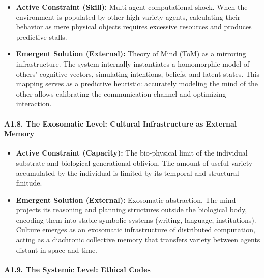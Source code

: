 \documentclass[11pt,a4paper,oneside]{article} %
\providecommand{\tightlist}{%
  \setlength{\itemsep}{0pt}\setlength{\parskip}{0pt}}
\begin{document}
\begin{itemize}
\tightlist
\item
  \textbf{Active Constraint (Skill):} Multi-agent computational shock.
  When the environment is populated by other high-variety agents,
  calculating their behavior as mere physical objects requires excessive
  resources and produces predictive stalls.
\item
  \textbf{Emergent Solution (External):} Theory of Mind (ToM) as a
  mirroring infrastructure. The system internally instantiates a
  homomorphic model of others' cognitive vectors, simulating intentions,
  beliefs, and latent states. This mapping serves as a predictive
  heuristic: accurately modeling the mind of the other allows
  calibrating the communication channel and optimizing interaction.
\end{itemize}

\hypertarget{a1.8.-the-exosomatic-level-cultural-infrastructure-as-external-memory}{%
\paragraph{A1.8. The Exosomatic Level: Cultural Infrastructure as
External
Memory}\label{a1.8.-the-exosomatic-level-cultural-infrastructure-as-external-memory}}

\begin{itemize}
\tightlist
\item
  \textbf{Active Constraint (Capacity):} The bio-physical limit of the
  individual substrate and biological generational oblivion. The amount
  of useful variety accumulated by the individual is limited by its
  temporal and structural finitude.
\item
  \textbf{Emergent Solution (External):} Exosomatic abstraction. The
  mind projects its reasoning and planning structures outside the
  biological body, encoding them into stable symbolic systems (writing,
  language, institutions). Culture emerges as an exosomatic
  infrastructure of distributed computation, acting as a diachronic
  collective memory that transfers variety between agents distant in
  space and time.
\end{itemize}

\hypertarget{a1.9.-the-systemic-level-ethical-codes}{%
\paragraph{A1.9. The Systemic Level: Ethical
Codes}\label{a1.9.-the-systemic-level-ethical-codes}}
\end{document}
